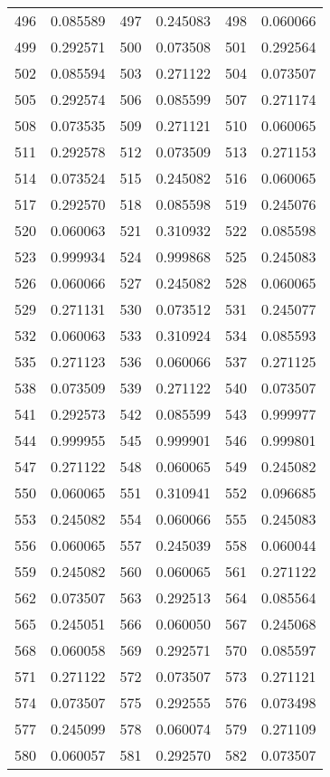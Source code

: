 \documentclass[12pt]{article}
\begin{document}
\begin{longtable}{@{}cc|cc|cc@{}}
496 & 0.085589 & 497 & 0.245083 & 498 & 0.060066 \\
499 & 0.292571 & 500 & 0.073508 & 501 & 0.292564 \\
502 & 0.085594 & 503 & 0.271122 & 504 & 0.073507 \\
505 & 0.292574 & 506 & 0.085599 & 507 & 0.271174 \\
508 & 0.073535 & 509 & 0.271121 & 510 & 0.060065 \\
511 & 0.292578 & 512 & 0.073509 & 513 & 0.271153 \\
514 & 0.073524 & 515 & 0.245082 & 516 & 0.060065 \\
517 & 0.292570 & 518 & 0.085598 & 519 & 0.245076 \\
520 & 0.060063 & 521 & 0.310932 & 522 & 0.085598 \\
523 & 0.999934 & 524 & 0.999868 & 525 & 0.245083 \\
526 & 0.060066 & 527 & 0.245082 & 528 & 0.060065 \\
529 & 0.271131 & 530 & 0.073512 & 531 & 0.245077 \\
532 & 0.060063 & 533 & 0.310924 & 534 & 0.085593 \\
535 & 0.271123 & 536 & 0.060066 & 537 & 0.271125 \\
538 & 0.073509 & 539 & 0.271122 & 540 & 0.073507 \\
541 & 0.292573 & 542 & 0.085599 & 543 & 0.999977 \\
544 & 0.999955 & 545 & 0.999901 & 546 & 0.999801 \\
547 & 0.271122 & 548 & 0.060065 & 549 & 0.245082 \\
550 & 0.060065 & 551 & 0.310941 & 552 & 0.096685 \\
553 & 0.245082 & 554 & 0.060066 & 555 & 0.245083 \\
556 & 0.060065 & 557 & 0.245039 & 558 & 0.060044 \\
559 & 0.245082 & 560 & 0.060065 & 561 & 0.271122 \\
562 & 0.073507 & 563 & 0.292513 & 564 & 0.085564 \\
565 & 0.245051 & 566 & 0.060050 & 567 & 0.245068 \\
568 & 0.060058 & 569 & 0.292571 & 570 & 0.085597 \\
571 & 0.271122 & 572 & 0.073507 & 573 & 0.271121 \\
574 & 0.073507 & 575 & 0.292555 & 576 & 0.073498 \\
577 & 0.245099 & 578 & 0.060074 & 579 & 0.271109 \\
580 & 0.060057 & 581 & 0.292570 & 582 & 0.073507 \\

\end{longtable}
\end{document}
